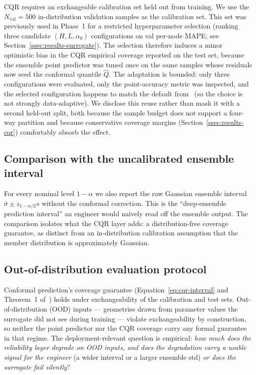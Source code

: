 \documentclass[11pt]{article}
\begin{document}
CQR requires an exchangeable calibration set held out from training. We use
the $N_{\mathrm{val}} = 500$ in-distribution validation samples as the
calibration set. This set was previously used in Phase~1 for a restricted
hyperparameter selection (ranking three candidate
$(H, L, \alpha_0)$ configurations on val per-node MAPE; see
Section~\ref{ssec:results-surrogate}). The selection therefore induces a
minor optimistic bias in the CQR empirical coverage reported on the test
set, because the ensemble point predictor was tuned once on the same
samples whose residuals now seed the conformal quantile $\hat{Q}$. The
adaptation is bounded: only three configurations were evaluated, only the
point-accuracy metric was inspected, and the selected configuration
happens to match the default from~\cite{pfaff2021meshgraphnets} (so the
choice is not strongly data-adaptive). We disclose this reuse rather than
mask it with a second held-out split, both because the sample budget does
not support a four-way partition and because conservative coverage
margins (Section~\ref{ssec:results-cqr}) comfortably absorb the effect.

\subsection{Comparison with the uncalibrated ensemble interval}

For every nominal level $1-\alpha$ we also report the raw Gaussian ensemble
interval $\bar{\sigma} \pm z_{1-\alpha/2} s$ without the conformal
correction. This is the ``deep-ensemble prediction interval'' an engineer
would naively read off the ensemble output. The comparison isolates what
the CQR layer adds: a distribution-free coverage guarantee, as distinct
from an in-distribution calibration assumption that the member distribution
is approximately Gaussian.

\subsection{Out-of-distribution evaluation protocol}
\label{ssec:ood-protocol}

Conformal prediction's coverage guarantee (Equation~\ref{eq:cqr-interval}
and Theorem~1 of~\cite{romano2019cqr}) holds under exchangeability of the
calibration and test sets. Out-of-distribution (OOD) inputs --- geometries
drawn from parameter values the surrogate did not see during training ---
violate exchangeability by construction, so neither the point predictor
nor the CQR coverage carry any formal guarantee in that regime. The
deployment-relevant question is empirical: \emph{how much does the
reliability layer degrade on OOD inputs, and does the degradation carry a
usable signal for the engineer} (a wider interval or a larger ensemble
std) \emph{or does the surrogate fail silently}?
\end{document}
